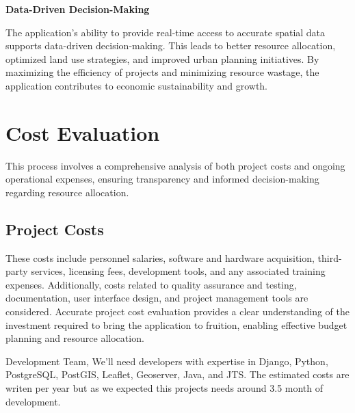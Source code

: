 \textbf{Data-Driven Decision-Making}

The application's ability to provide real-time access to accurate spatial data supports data-driven decision-making.
This leads to better resource allocation, optimized land use strategies, and improved urban planning initiatives.
By maximizing the efficiency of projects and minimizing resource wastage, the application contributes to economic sustainability and growth.


\section{Cost Evaluation}\label{sec:cost-evaluation}
This process involves a comprehensive analysis of both project costs and ongoing operational expenses, ensuring transparency and informed decision-making regarding resource allocation.
\subsection{Project Costs}\label{subsec:project-costs}
These costs include personnel salaries, software and hardware acquisition, third-party services, licensing fees, development tools, and any associated training expenses.
Additionally, costs related to quality assurance and testing, documentation, user interface design, and project management tools are considered.
Accurate project cost evaluation provides a clear understanding of the investment required to bring the application to fruition, enabling effective budget planning and resource allocation.

Development Team, We'll need developers with expertise in Django, Python, PostgreSQL, PostGIS, Leaflet, Geoserver, Java, and JTS.
The estimated costs are writen per year but as we expected this projects needs around 3.5 month of development.

